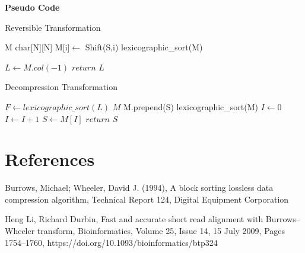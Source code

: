 \documentclass{article}
\begin{document}
   
\textbf{Pseudo Code}

    
    
    \begin{algorithm}
        \caption{Reversible Transformation}
        \begin{algorithmic}
            \State M \gets char[N][N]      
                \State M[i]$ \gets$ Shift(S,i) 
            \EndFor
            \State lexicographic\_sort(M)
            
            \State $L \gets M.col(-1)$ 
            \State $return$ $L$
            \EndProcedure
        \end{algorithmic}
    \end{algorithm}

    \begin{algorithm}
        \caption{Decompression Transformation}
        \begin{algorithmic}
            \State $F \gets lexicographic\_sort(L)$
            \State $M$
                \State M.prepend(S) 
                \State lexicographic\_sort(M)
            \EndFor
           \State $I\gets 0$
                \State $I\gets I+1$
            \EndWhile
            \State $S \gets M[I]$ 
            \State $return$ $S$
            \EndProcedure
        \end{algorithmic}
    \end{algorithm}
       
   \section{References}
    \makebox[.5cm]{[1]}  Burrows, Michael; Wheeler, David J. (1994), A block sorting lossless data compression algorithm, Technical Report 124, Digital Equipment Corporation\par
    \makebox[.5cm]{[2]} Heng Li, Richard Durbin, Fast and accurate short read alignment with Burrows–Wheeler transform, Bioinformatics, Volume 25, Issue 14, 15 July 2009, Pages 1754–1760, https://doi.org/10.1093/bioinformatics/btp324\par
    \makebox[.5cm]{[4]} \par
    \makebox[.5cm]{[5]} \par
    \makebox[.5cm]{[6]} \par
\end{document}
